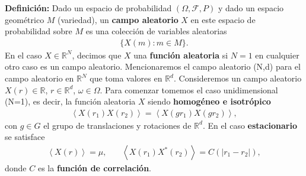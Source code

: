 \documentclass[20pt,margin=1in,innermargin=-4.5in,blockverticalspace=-0.25in]{tikzposter}
\begin{document}
\begin{columns}
{        \textbf{Definición:} Dado un espacio de probabilidad $(\Omega,\mathcal{F},P)$ y dado un espacio geométrico $M$ (variedad), un \textbf{campo aleatorio} $X$ en este espacio de probabilidad sobre $M$ es una colección de variables aleatorias 
        \vspace{-0.5cm}
        \begin{align}
            \{ X(m): m\in M\}.
            \label{13.30}
        \end{align}
        En el caso $X\in \mathbb{R}^N$, decimos que $X$ una \textbf{función aleatoria} si $ N=1$ en cualquier otro caso es un campo aleatorio. Mencionaremos el campo aleatorio (N,d) para el campo aleatorio en $\mathbb{R}^N$ que toma valores en $\mathbb{R}^d$. Consideremos un campo aleatorio  $X(r) \in \mathbb{R}$, $r\in\mathbb{R}^d$, $\omega \in \Omega$. Para comenzar tomemos el caso unidimensional (N=1), es decir, la función aleatoria $X$ siendo \textbf{homogéneo e isotrópico}
        \begin{align}
            \left \langle X(r_1)X(r_2) \right\rangle = \left \langle X(gr_1)X(gr_2) \right\rangle,
            \label{11.01}
        \end{align}
        con $g \in G$ el grupo de translaciones y rotaciones de $\mathbb{R}^d$. En el caso \textbf{estacionario}
        se satisface
        \vspace{-0.5cm}
        \begin{align}
            \left\langle X(r) \right \rangle = \mu, \:\:\:\:\:\:\:\:    \left \langle X(r_1)X^*(r_2) \right \rangle = C(|r_1-r_2|),
        \end{align}
        donde $C$ es la \textbf{función de correlación}.
    
    }

    
    

\end{columns}
\end{document}
